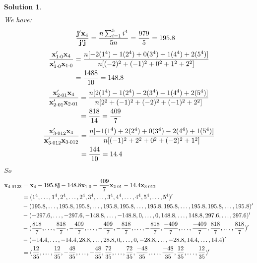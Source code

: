 \documentclass[11pt]{article}
\newtheorem{sol}{Solution}
\begin{document}
\begin{sol}
\begin{align*}
\end{align*}
We have:
\begin{align*}
	 \frac{{\bf j}'{\bf x}_4}{{\bf j}'{\bf j}} &= \frac{n\sum_{i = 1}^{5} i^4}{5n} = \frac{979}{5} = 195.8
\end{align*}
\begin{align*}
	\frac{{\bf x}'_{1\cdot 0}{\bf x}_4}{{\bf x}'_{1\cdot 0}{\bf x}_{1\cdot 0}} 
	&= \frac{n[-2(1^4)-1(2^4)+ 0(3^4)+ 1(4^4) + 2(5^4)]}{n[(-2)^2 + (-1)^2 + 0^2 + 1^2 + 2^2]}\\
	&= \frac{1488}{10} = 148.8
\end{align*}
\begin{align*}
	\frac{{\bf x}'_{2\cdot 01}{\bf x}_4}{{\bf x}'_{2\cdot 01}{\bf x}_{2\cdot 01}} &= 
	\frac{n[2(1^4)-1(2^4)-2(3^4)-1(4^4)+2(5^4)]}{n[2^2 +(-1)^2 + (-2)^2 + (-1)^2 +2^2]}\\
	&= \frac{818}{14} = \frac{409}{7}
\end{align*}
\begin{align*}
	 \frac{{\bf x}'_{3\cdot 012}{\bf x}_4}{{\bf x}'_{3\cdot 012}{\bf x}_{3\cdot 012}} 
	 &= \frac{n[-1(1^4)+ 2(2^4) + 0(3^4)  -2(4^4)+ 1(5^4)]}{n[(-1)^2 + 2^2 + 0^2 + (-2)^2 + 1^2]}\\
	 &= \frac{144}{10} = 14.4
\end{align*}
So
\begin{align*}
	{\bf x}_{4\cdot 0123} &= {\bf x}_4 - 195.8{\bf j} - 148.8{\bf x}_{1\cdot 0} - \frac{409}{7}{\bf x}_{2\cdot 01} - 14.4{\bf x}_{3\cdot 012}\\
	&= (1^4, \ldots, 1^4, 2^4, \ldots, 2^4, 3^4, \ldots, 3^4, 4^4, \ldots, 4^4, 5^4, \ldots, 5^4)'\\
	&- (195.8, \ldots, 195.8, 195.8, \ldots, 195.8, 195.8, \ldots, 195.8, 195.8, \ldots, 195.8, 195.8, \ldots, 195.8)'\\
	&- (-297.6, \ldots, -297.6, -148.8, \ldots, -148.8, 0, \ldots, 0, 148.8, \ldots, 148.8, 297.6, \ldots, 297.6)'\\
	&- (\frac{818}{7}, \ldots, \frac{818}{7}, -\frac{409}{7}, \ldots, -\frac{409}{7}, -\frac{818}{7}, \ldots, -\frac{818}{7}, \frac{-409}{7}, \ldots, \frac{-409}{7}, \frac{818}{7}, \ldots, \frac{818}{7})'\\
	&- (-14.4, \ldots, -14.4, 28.8, \ldots, 28.8, 0, \ldots, 0, -28.8, \ldots, -28.8, 14.4, \ldots, 14.4)'\\
	&= (\frac{12}{35}, \ldots, \frac{12}{35}, -\frac{48}{35}, \ldots, -\frac{48}{35}, \frac{72}{35}, \ldots, \frac{72}{35}, \frac{-48}{35}, \ldots, \frac{-48}{35}, \frac{12}{35}, \ldots, \frac{12}{35})'

\end{align*}
\end{sol}
\end{document}
